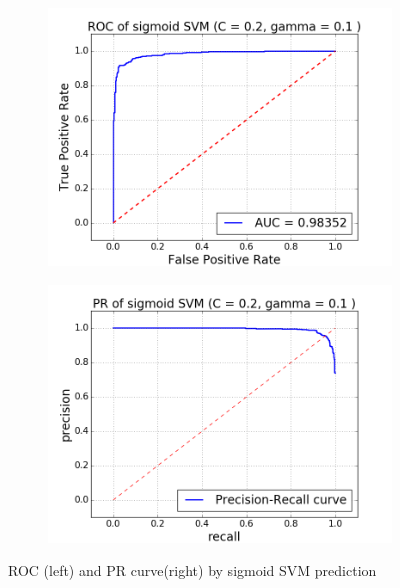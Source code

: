 \documentclass{article}
\begin{document}
\begin{singlespacing}
\begin{figure}[H]
    \centering
    \begin{subfigure}[b]{0.4\textwidth}
        \includegraphics[width=\textwidth]{ssvm_roc.png}
    \end{subfigure}
    \begin{subfigure}[b]{0.4\textwidth}
        \includegraphics[width=\textwidth]{ssvm_pr.png}
    \end{subfigure}
    \caption{ROC (left) and PR curve(right) by sigmoid SVM prediction}\label{fig:ssvm}
\end{figure}



\end{singlespacing}
\end{document}
